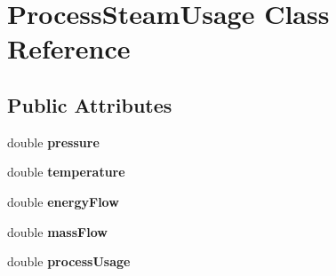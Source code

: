 \hypertarget{class_process_steam_usage}{}\section{Process\+Steam\+Usage Class Reference}
\label{class_process_steam_usage}
\subsection*{Public Attributes}
\begin{DoxyCompactItemize}
\item 
\mbox{\label{class_process_steam_usage_a93f386b8bed14dc0f29b41ad8a0c5429}} 
double {\bfseries pressure}
\item 
\mbox{\label{class_process_steam_usage_af23ad196c3a1bc11e876b0864fbc6837}} 
double {\bfseries temperature}
\item 
\mbox{\label{class_process_steam_usage_a96e1ffab25fb4e15d61fcbe643e955c8}} 
double {\bfseries energy\+Flow}
\item 
\mbox{\label{class_process_steam_usage_abcd73ef9ccd8028afdfc38e9e490bc68}} 
double {\bfseries mass\+Flow}
\item 
\mbox{\label{class_process_steam_usage_a0722f50096df621af9ef210931b040d8}} 
double {\bfseries process\+Usage}
\end{DoxyCompactItemize}
